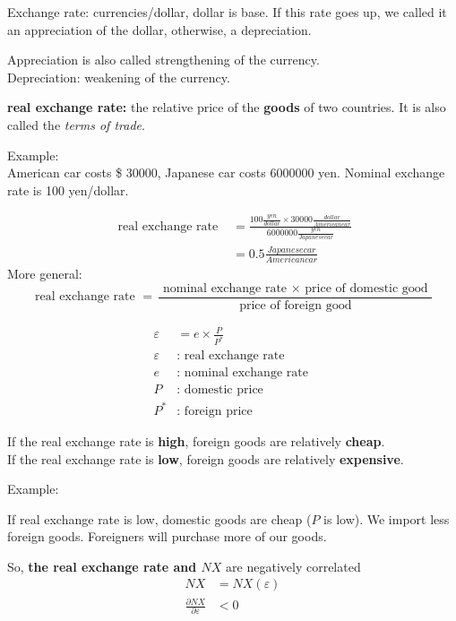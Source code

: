 \documentclass[12pt]{article}
\begin{document}
Exchange rate: currencies/dollar, dollar is base.
If this rate goes up, we called it an appreciation of the dollar, otherwise, 
a depreciation.

Appreciation is also called strengthening of the currency.\\
Depreciation: weakening of the currency.



{\textbf {real exchange rate:}} the relative price of the {\textbf {goods}} of two 
countries. It is also called the \textit{terms of trade}.

Example:\\
American car costs \$ 30000, Japanese car costs 6000000 yen. Nominal exchange rate
is 100 yen/dollar.

\begin{align*}
\text{ real exchange rate } &= \frac{100 \frac{yen}{dollar} \times 30000
\frac{dollar}{American car}}{6000000 \frac{yen}{Japanese car}}\\
 &= 0.5 \frac{Japanese car}{American car}
\end{align*}
More general:
\begin{equation*}
\text{ real exchange rate } = \frac{\text{ nominal exchange rate } \times 
\text{ price of domestic good }}{\text{ price of foreign good }}
\end{equation*}

\begin{align*}
\varepsilon &= e  \times \frac{P}{P^{*}}\\
\varepsilon &\text{: real exchange rate }\\
e &: \text{ nominal exchange rate }\\
P &: \text{ domestic price }\\
P^{*} &: \text{ foreign price }
\end{align*}

If the real exchange rate is {\textbf {high}}, foreign goods are relatively 
{\textbf {cheap}}.\\
If the real exchange rate is {\textbf {low}}, foreign goods are relatively 
{\textbf {expensive}}.

Example:

If real exchange rate is low, domestic goods are cheap ($ P $ is low). We import 
less foreign goods. Foreigners will purchase more of our goods.

So, {\textbf {the real exchange rate and $ NX $} are negatively correlated}
\begin{align*}
NX &= NX(\varepsilon)\\
\frac{\partial NX }{\partial \varepsilon } &< 0
\end{align*}
\end{document}
